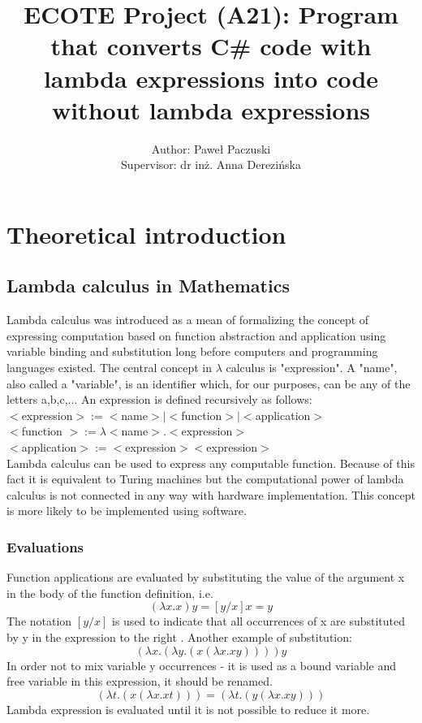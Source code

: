 \documentclass[]{report}
\title{ECOTE Project (A21):  Program that converts C\# code with lambda expressions into code without lambda expressions}
\author{Author: Paweł Paczuski \\ Supervisor: dr inż. Anna Derezińska}
\begin{document}
    \maketitle
    
    \tableofcontents
    \pagebreak
    
    \chapter{Theoretical introduction}
    \section{Lambda calculus in Mathematics}
    Lambda calculus was introduced as a mean of formalizing the concept of expressing computation based on function abstraction and application using variable binding and substitution long before computers and programming languages existed. \cite{lambddef}
    The central concept in $\lambda$ calculus is "expression". A  "name",  also  called a "variable", is an identifier which, for our purposes, can be any of the letters
    a,b,c,...
    An expression is defined recursively as follows\cite{lambdintro}:\\
    $<$expression$>:=< $name$ >|< $function$ >|< $application$ > $ \\
    $<$function $>:= \lambda < $name$ >.< $expression$ > $\\
    $<$application$>:=<$expression$ >< $expression$ > $\\
    
    Lambda  calculus can be used to express any computable function. Because of this fact it is equivalent to Turing machines but the computational power of lambda calculus is not connected in any way with hardware implementation. This concept is more likely to be implemented using software.
    
    \subsection{Evaluations}
Function applications are evaluated by substituting the value of the argument x in the body of the function definition, i.e.
\begin{equation}
    (\lambda x.x)y=[y/x]x=y
\end{equation}
The notation $[y/x]$ is used to indicate that all occurrences of x are substituted by y in the expression to the right \cite{lambdintro}.
Another example of substitution:
\begin{equation}
(\lambda x.(\lambda y.(x(\lambda x.xy))))y
\end{equation}
In order not to mix variable y occurrences - it is used as a bound variable and free variable in this expression, it should be renamed\cite{lambdintro}.
\begin{equation}
[y/x](\lambda t.(x(\lambda x.xt))) = (\lambda t.(y(\lambda x.xy)))
\end{equation}
Lambda expression is evaluated until it is not possible to reduce it more.\cite{lambdintro}
\end{document}
